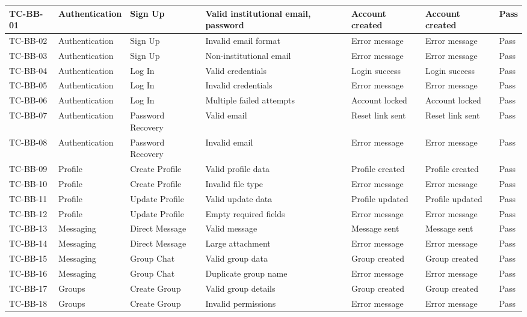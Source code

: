 {\begin{longtable}{|p{1.5cm}|p{2.2cm}|p{2.5cm}|p{2.5cm}|p{2.5cm}|p{2.5cm}|p{1.5cm}|}
TC-BB-01 & Authentication & Sign Up & Valid institutional email, password & Account created & Account created & Pass \\
\hline
TC-BB-02 & Authentication & Sign Up & Invalid email format & Error message & Error message & Pass \\
\hline
TC-BB-03 & Authentication & Sign Up & Non-institutional email & Error message & Error message & Pass \\
\hline
TC-BB-04 & Authentication & Log In & Valid credentials & Login success & Login success & Pass \\
\hline
TC-BB-05 & Authentication & Log In & Invalid credentials & Error message & Error message & Pass \\
\hline
TC-BB-06 & Authentication & Log In & Multiple failed attempts & Account locked & Account locked & Pass \\
\hline
TC-BB-07 & Authentication & Password Recovery & Valid email & Reset link sent & Reset link sent & Pass \\
\hline
TC-BB-08 & Authentication & Password Recovery & Invalid email & Error message & Error message & Pass \\
\hline
TC-BB-09 & Profile & Create Profile & Valid profile data & Profile created & Profile created & Pass \\
\hline
TC-BB-10 & Profile & Create Profile & Invalid file type & Error message & Error message & Pass \\
\hline
TC-BB-11 & Profile & Update Profile & Valid update data & Profile updated & Profile updated & Pass \\
\hline
TC-BB-12 & Profile & Update Profile & Empty required fields & Error message & Error message & Pass \\
\hline
TC-BB-13 & Messaging & Direct Message & Valid message & Message sent & Message sent & Pass \\
\hline
TC-BB-14 & Messaging & Direct Message & Large attachment & Error message & Error message & Pass \\
\hline
TC-BB-15 & Messaging & Group Chat & Valid group data & Group created & Group created & Pass \\
\hline
TC-BB-16 & Messaging & Group Chat & Duplicate group name & Error message & Error message & Pass \\
\hline
TC-BB-17 & Groups & Create Group & Valid group details & Group created & Group created & Pass \\
\hline
TC-BB-18 & Groups & Create Group & Invalid permissions & Error message & Error message & Pass \\

\end{longtable}}
